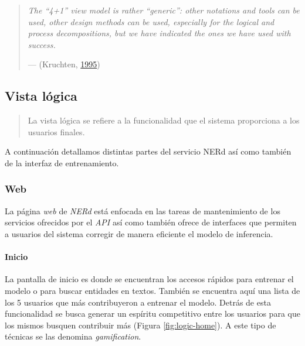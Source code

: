 \documentclass[12pt,a4paper,]{scrartcl}
\let\oldparagraph\paragraph
\renewcommand{\paragraph}[1]{\oldparagraph{#1}\mbox{}}
\begin{document}
\begin{quote}
\emph{The \enquote{4+1} view model is rather \enquote{generic}: other notations and tools can be used, other design methods can be used, especially for the logical and process decompositions, but we have indicated the ones we have used with success.}

\hfill --- (Kruchten, \protect\hyperlink{ref-Kruchten:1995:VMA:624610.625529}{1995})
\end{quote}

\hypertarget{vista-luxf3gica}{%
\subsection{Vista lógica}\label{vista-luxf3gica}}

\begin{quote}
La vista lógica se refiere a la funcionalidad que el sistema proporciona a los usuarios finales.
\end{quote}

A continuación detallamos distintas partes del servicio NERd así como también de la interfaz de entrenamiento.

\hypertarget{web}{%
\subsubsection{Web}\label{web}}

La página \emph{web} de \emph{NERd} está enfocada en las tareas de mantenimiento de los servicios ofrecidos por el \emph{API} así como también ofrece de interfaces que permiten a usuarios del sistema corregir de manera eficiente el modelo de inferencia.

\hypertarget{inicio}{%
\paragraph{Inicio}\label{inicio}}

La pantalla de inicio es donde se encuentran los accesos rápidos para entrenar el modelo o para buscar entidades en textos.
También se encuentra aquí una lista de los 5 usuarios que más contribuyeron a entrenar el modelo. Detrás de esta funcionalidad se busca generar un espíritu competitivo entre los usuarios para que los mismos busquen contribuir más (Figura \ref{fig:logic-home}). A este tipo de técnicas se las denomina \emph{gamification}.
\end{document}
